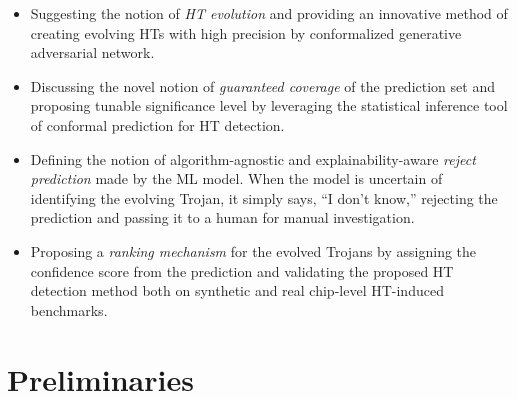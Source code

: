 \documentclass[9pt,conference]{IEEEtran}
\begin{document}
\begin{itemize}
\item Suggesting the notion of \textit{HT evolution} and providing an innovative method of creating evolving HTs with high precision by conformalized generative adversarial network.
\item Discussing the novel notion of \textit{guaranteed coverage} of the prediction set and proposing tunable significance level by leveraging the statistical inference tool of conformal prediction for HT detection.
\item Defining the notion of algorithm-agnostic and explainability-aware \textit{reject prediction} made by the ML model. When the model is uncertain of identifying the evolving Trojan, it simply says, ``I don't know,'' rejecting the prediction and passing it to a human for manual investigation.
\item Proposing a \textit{ranking mechanism} for the evolved Trojans by assigning the confidence score from the prediction and validating the proposed HT detection method both on synthetic and real chip-level HT-induced benchmarks.
\end{itemize}


\section{Preliminaries}
\label{Sec:Prelem}

\end{document}
